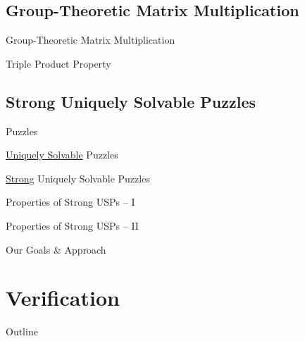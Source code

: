 \documentclass[t,10pt,
mathserif,xcolor=dvipsnames]{beamer}
\begin{document}
\subsection{Group-Theoretic Matrix Multiplication}

\begin{myframe}{Group-Theoretic Matrix Multiplication}

\end{myframe}

\begin{myframe}{Triple Product Property}

\end{myframe}

\subsection{Strong Uniquely Solvable Puzzles}

\begin{myframe}{Puzzles}

\end{myframe}

\begin{myframe}{\uline{Uniquely Solvable} Puzzles}

\end{myframe}

\begin{myframe}{\uline{Strong} Uniquely Solvable Puzzles}

\end{myframe}

\begin{myframe}{Properties of Strong USPs -- I}

\end{myframe}

\begin{myframe}{Properties of Strong USPs -- II}

\end{myframe}

\begin{myframe}{Our Goals \& Approach}

\end{myframe}

\section{Verification}

\begin{myframe}{Outline}

\end{myframe}
\end{document}
